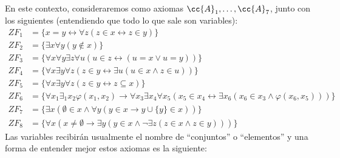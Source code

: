 En este contexto, consideraremos como axiomas $\cc{A}_1,\ldots,\cc{A}_7$, junto con los siguientes (entendiendo que todo lo que sale son variables):
\begin{align*}
    ZF_1 &= \{x=y \leftrightarrow \forall z(z\in x \leftrightarrow z\in y)\} \\
    ZF_2 &= \{\exists x\forall y(y\notin x) \} \\
    ZF_3 &= \{\forall x\forall y\exists z\forall u(u\in z\leftrightarrow (u=x\lor u=y))\} \\
    ZF_4 &= \{\forall x\exists y\forall z(z\in y\leftrightarrow \exists u(u\in x\land z\in u))\} \\
    ZF_5 &= \{\forall x\exists y\forall z(z\in y\leftrightarrow z\subseteq x)\} \\
    ZF_6 &= \{\forall x_1\exists_1x_2\varphi(x_1,x_2)\to \forall x_3\exists x_4\forall x_5(x_5\in x_4\leftrightarrow \exists x_6(x_6\in x_3\land \varphi(x_6,x_5)))\} \\
    ZF_7 &= \{\exists x(\emptyset \in x\land \forall y(y\in x\to y\cup \{y\}\in x))\} \\
    ZF_8 &= \{\forall x(x\neq \emptyset \to \exists y(y\in x\land \lnot\exists z(z\in x\land z\in y)))\}
\end{align*}
Las variables recibirán usualmente el nombre de ``conjuntos'' o ``elementos'' y una forma de entender mejor estos axiomas es la siguiente:
